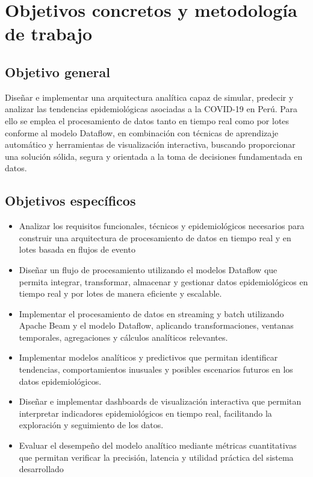 \documentclass[12pt,a4paper]{article}
\providecommand{\tightlist}{%
  \setlength{\itemsep}{0pt}\setlength{\parskip}{0pt}}
\begin{document}
\clearpage
\section{Objetivos concretos y metodología de trabajo}\label{objetivos-concretos-y-metodologuxeda-de-trabajo}

\subsection{Objetivo general}\label{objetivo-general}

Diseñar e implementar una arquitectura analítica capaz de simular, predecir y analizar las tendencias epidemiológicas asociadas a la COVID-19 en Perú. Para ello se emplea el procesamiento de datos tanto en tiempo real como por lotes conforme al modelo Dataflow, en combinación con técnicas de aprendizaje automático y herramientas de visualización interactiva, buscando proporcionar una solución sólida, segura y orientada a la toma de decisiones fundamentada en datos.

\subsection{Objetivos específicos}\label{objetivos-especuxedficos}

\begin{itemize}
    \tightlist
    \item
          Analizar los requisitos funcionales, técnicos y epidemiológicos necesarios para construir una arquitectura de procesamiento de datos en tiempo real y en lotes basada en flujos de evento
    \item
          Diseñar un flujo de procesamiento utilizando el modelos Dataflow que permita integrar, transformar, almacenar y gestionar datos epidemiológicos en tiempo real y por lotes de manera eficiente y escalable.
    \item
          Implementar el procesamiento de datos en streaming y batch utilizando Apache Beam y el modelo Dataflow, aplicando transformaciones, ventanas temporales, agregaciones y cálculos analíticos relevantes.
    \item
          Implementar modelos analíticos y predictivos que permitan identificar tendencias, comportamientos inusuales y posibles escenarios futuros en los datos epidemiológicos.
    \item
          Diseñar e implementar dashboards de visualización interactiva que permitan interpretar indicadores epidemiológicos en tiempo real, facilitando la exploración y seguimiento de los datos.
    \item
          Evaluar el desempeño del modelo analítico mediante métricas cuantitativas que permitan verificar la precisión, latencia y utilidad práctica del sistema desarrollado
\end{itemize}
\end{document}

